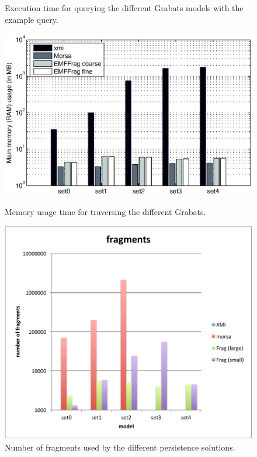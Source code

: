 \begin{figure}[ht]
\begin{minipage}[b]{0.48\linewidth}
\caption{Execution time for querying the different Grabats models with the example query.}
\label{fig:grabatsQueryTime}
\end{minipage}
\begin{minipage}[b]{0.48\linewidth}
\centering
\vspace{0.04\linewidth}
\includegraphics[width=\linewidth]{figures/grabatsTraverseMem}
\caption{Memory usage time for traversing the different Grabats.}
\label{fig:grabatsTraverseMem}
\end{minipage}
\hspace{0.02\linewidth}
\begin{minipage}[b]{0.48\linewidth}
\centering
\includegraphics[width=\linewidth]{figures/grabatsFragments}
\caption{Number of fragments used by the different persistence solutions.}
\label{fig:grabatsFragments}
\end{minipage}
\end{figure}

